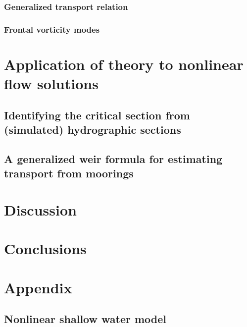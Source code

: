 \documentclass{jfm}
\begin{document}
\subsubsection{Generalized transport relation}

\subsubsection{Frontal vorticity modes}

\section{Application of theory to nonlinear flow solutions}

\subsection{Identifying the critical section from (simulated) hydrographic sections}

\subsection{A generalized weir formula for estimating transport from moorings}



\section{Discussion}

\section{Conclusions}

\section{Appendix}

\subsection{Nonlinear shallow water model}



\end{document}
